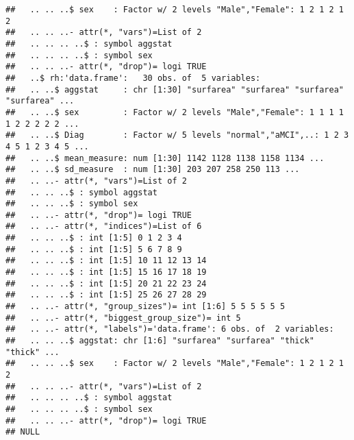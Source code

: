 \documentclass[12pt]{article}\usepackage[]{graphicx}\usepackage[]{color}
\makeatletter
\newenvironment{kframe}{%
 \def\at@end@of@kframe{}%
 \ifinner\ifhmode%
  \def\at@end@of@kframe{\end{minipage}}%
  \begin{minipage}{\columnwidth}%
 \fi\fi%
 \def\FrameCommand##1{\hskip\@totalleftmargin \hskip-\fboxsep
 \colorbox{shadecolor}{##1}\hskip-\fboxsep
     \hskip-\linewidth \hskip-\@totalleftmargin \hskip\columnwidth}%
 \MakeFramed {\advance\hsize-\width
   \@totalleftmargin\z@ \linewidth\hsize
   \@setminipage}}%
 {\par\unskip\endMakeFramed%
 \at@end@of@kframe}
\newenvironment{knitrout}{}{} %
\makeatother
\begin{document}
\begin{knitrout}
\begin{kframe}
\begin{verbatim}
##   .. .. ..$ sex    : Factor w/ 2 levels "Male","Female": 1 2 1 2 1 2
##   .. .. ..- attr(*, "vars")=List of 2
##   .. .. .. ..$ : symbol aggstat
##   .. .. .. ..$ : symbol sex
##   .. .. ..- attr(*, "drop")= logi TRUE
##   ..$ rh:'data.frame':	30 obs. of  5 variables:
##   .. ..$ aggstat     : chr [1:30] "surfarea" "surfarea" "surfarea" "surfarea" ...
##   .. ..$ sex         : Factor w/ 2 levels "Male","Female": 1 1 1 1 1 2 2 2 2 2 ...
##   .. ..$ Diag        : Factor w/ 5 levels "normal","aMCI",..: 1 2 3 4 5 1 2 3 4 5 ...
##   .. ..$ mean_measure: num [1:30] 1142 1128 1138 1158 1134 ...
##   .. ..$ sd_measure  : num [1:30] 203 207 258 250 113 ...
##   .. ..- attr(*, "vars")=List of 2
##   .. .. ..$ : symbol aggstat
##   .. .. ..$ : symbol sex
##   .. ..- attr(*, "drop")= logi TRUE
##   .. ..- attr(*, "indices")=List of 6
##   .. .. ..$ : int [1:5] 0 1 2 3 4
##   .. .. ..$ : int [1:5] 5 6 7 8 9
##   .. .. ..$ : int [1:5] 10 11 12 13 14
##   .. .. ..$ : int [1:5] 15 16 17 18 19
##   .. .. ..$ : int [1:5] 20 21 22 23 24
##   .. .. ..$ : int [1:5] 25 26 27 28 29
##   .. ..- attr(*, "group_sizes")= int [1:6] 5 5 5 5 5 5
##   .. ..- attr(*, "biggest_group_size")= int 5
##   .. ..- attr(*, "labels")='data.frame':	6 obs. of  2 variables:
##   .. .. ..$ aggstat: chr [1:6] "surfarea" "surfarea" "thick" "thick" ...
##   .. .. ..$ sex    : Factor w/ 2 levels "Male","Female": 1 2 1 2 1 2
##   .. .. ..- attr(*, "vars")=List of 2
##   .. .. .. ..$ : symbol aggstat
##   .. .. .. ..$ : symbol sex
##   .. .. ..- attr(*, "drop")= logi TRUE
## NULL
\end{verbatim}
\end{kframe}
\end{knitrout}







%


\end{document}
